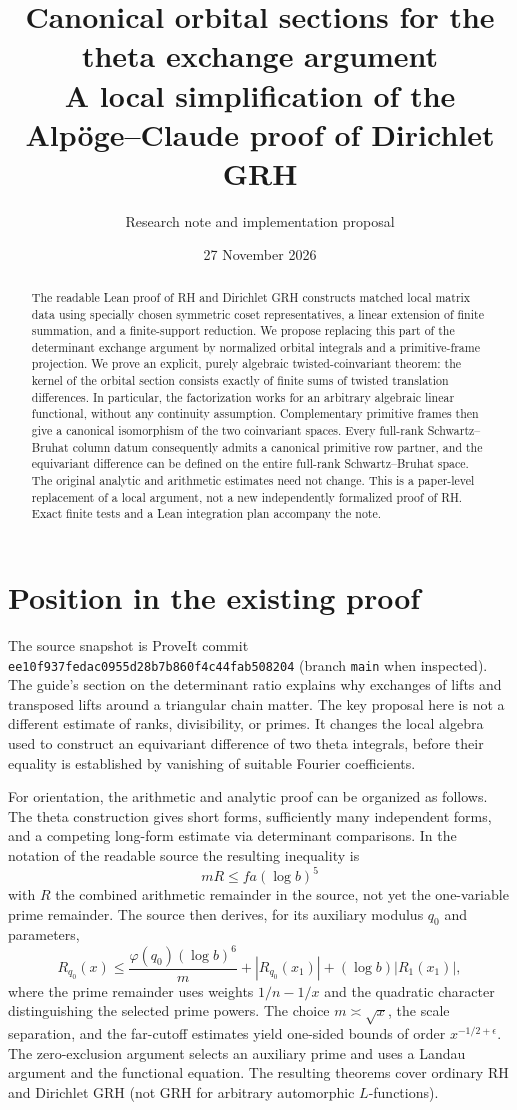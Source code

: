 \documentclass[11pt]{article}
\title{\vspace{-1.4em}\color{navy}\bfseries Canonical orbital sections for the theta exchange argument\\[5pt]\large A local simplification of the Alp\"oge--Claude proof of Dirichlet GRH}
\author{Research note and implementation proposal}
\date{27 November 2026}
\theoremstyle{remark}\newtheorem{remark}[theorem]{Remark}
\begin{document}
\maketitle
\begin{abstract}
The readable Lean proof of RH and Dirichlet GRH constructs matched local matrix data using specially chosen symmetric coset representatives, a linear extension of finite summation, and a finite-support reduction. We propose replacing this part of the determinant exchange argument by normalized orbital integrals and a primitive-frame projection. We prove an explicit, purely algebraic twisted-coinvariant theorem: the kernel of the orbital section consists exactly of finite sums of twisted translation differences. In particular, the factorization works for an arbitrary algebraic linear functional, without any continuity assumption. Complementary primitive frames then give a canonical isomorphism of the two coinvariant spaces. Every full-rank Schwartz--Bruhat column datum consequently admits a canonical primitive row partner, and the equivariant difference can be defined on the entire full-rank Schwartz--Bruhat space. The original analytic and arithmetic estimates need not change. This is a paper-level replacement of a local argument, not a new independently formalized proof of RH. Exact finite tests and a Lean integration plan accompany the note.
\end{abstract}
{\small\tableofcontents}\clearpage
\section{Position in the existing proof}
The source snapshot is ProveIt commit \texttt{ee10f937fedac0955d28b\allowbreak 7b860f4c44fab508204} (branch \texttt{main} when inspected). The guide's section on the determinant ratio explains why exchanges of lifts and transposed lifts around a triangular chain matter. The key proposal here is not a different estimate of ranks, divisibility, or primes. It changes the local algebra used to construct an equivariant difference of two theta integrals, before their equality is established by vanishing of suitable Fourier coefficients.

For orientation, the arithmetic and analytic proof can be organized as follows. The theta construction gives short forms, sufficiently many independent forms, and a competing long-form estimate via determinant comparisons. In the notation of the readable source the resulting inequality is
\[
 mR\leq f a(\log b)^5
\]
with $R$ the combined arithmetic remainder in the source, not yet the one-variable prime remainder. The source then derives, for its auxiliary modulus $q_0$ and parameters,
\[
 R_{q_0}(x)\leq \frac{\varphi(q_0)(\log b)^6}{m}
   +|R_{q_0}(x_1)|+(\log b)|R_1(x_1)|,
\]
where the prime remainder uses weights $1/n-1/x$ and the quadratic character distinguishing the selected prime powers. The choice $m\asymp\sqrt{x}$, the scale separation, and the far-cutoff estimates yield one-sided bounds of order $x^{-1/2+\epsilon}$. The zero-exclusion argument selects an auxiliary prime and uses a Landau argument and the functional equation. The resulting theorems cover ordinary RH and Dirichlet GRH (not GRH for arbitrary automorphic $L$-functions).
\end{document}
